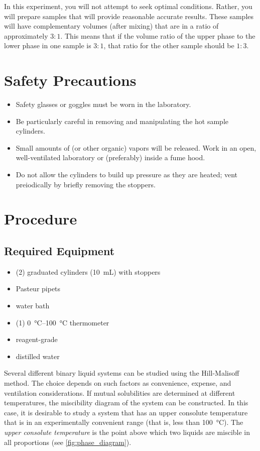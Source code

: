 In this experiment, you will not attempt to seek optimal conditions. 
Rather, you will prepare samples that will provide reasonable accurate results. 
These samples will have complementary volumes (after mixing) that are in a ratio of approximately \(3{:}1\). This means that if the volume ratio of the upper phase to the lower phase in one sample is \(3{:}1\), that ratio for the other sample should be \(1{:}3\).

\section{Safety Precautions}
\label{sec:safety}

\begin{itemize}
	\item Safety glasses or goggles must be worn in the laboratory.
	\item Be particularly careful in removing and manipulating the hot sample cylinders.
	\item Small amounts of  (or other organic) vapors will be released. Work in an open, well-ventilated laboratory or (preferably) inside a fume hood.
	\item Do not allow the cylinders to build up pressure as they are heated; vent preiodically by briefly removing the stoppers.
\end{itemize}

\section{Procedure}
\label{sec:procedure}

\subsection{Required Equipment}
\label{subs:required_equipment}

\begin{itemize}
	\item (2) graduated cylinders (\qty{10}{\mL}) with stoppers
	\item Pasteur pipets
	\item water bath
	\item (1) \qtyrange{0}{100}{\celsius} thermometer
	\item reagent-grade 
	\item distilled water
\end{itemize}

Several different binary liquid systems can be studied using the Hill-Malisoff method. 
The choice depends on such factors as convenience, expense, and ventilation considerations. 
If mutual solubilities are determined at different temperatures, the miscibility diagram of the system can be constructed. 
In this case, it is desirable to study a system that has an upper consolute temperature that is in an experimentally convenient range (that is, less than \qty{100}{\degreeCelsius}). The \emph{upper consolute temperature} is the point above which two liquids are miscible in all proportions (see \cref{fig:phase_diagram}). 

